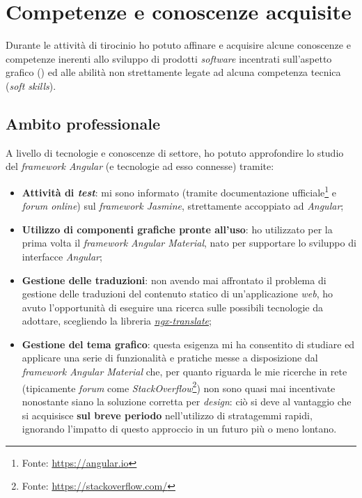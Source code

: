 \section{Competenze e conoscenze acquisite}
Durante le attività di tirocinio ho potuto affinare e acquisire alcune conoscenze e competenze inerenti allo sviluppo di prodotti \textit{software} incentrati sull'aspetto grafico () ed alle abilità non strettamente legate ad alcuna competenza tecnica (\textit{soft skills}).
\subsection*{Ambito professionale}
A livello di tecnologie e conoscenze di settore, ho potuto approfondire lo studio del \textit{framework Angular} (e tecnologie ad esso connesse) tramite:
\begin{itemize}
    \item \textbf{Attività di \textit{test}}: mi sono informato (tramite documentazione ufficiale\footnote{Fonte: \href{https://angular.io/guide/testing}{https://angular.io}} e \textit{forum online}) sul \textit{framework Jasmine}, strettamente accoppiato ad \textit{Angular};
    \item \textbf{Utilizzo di componenti grafiche pronte all'uso}: ho utilizzato per la prima volta il \textit{framework Angular Material}, nato per supportare lo sviluppo di interfacce \textit{Angular};
    \item \textbf{Gestione delle traduzioni}: non avendo mai affrontato il problema di gestione delle traduzioni del contenuto statico di un'applicazione \textit{web}, ho avuto l'opportunità di eseguire una ricerca sulle possibili tecnologie da adottare, scegliendo la libreria \hyperref[subsubsec:ngx]{\textit{ngx-translate}};
    \item \textbf{Gestione del tema grafico}: questa esigenza mi ha consentito di studiare ed applicare una serie di funzionalità e pratiche messe a disposizione dal \textit{framework Angular Material} che, per quanto riguarda le mie ricerche in rete (tipicamente \textit{forum} come \textit{StackOverflow}\footnote{Fonte: \href{https://stackoverflow.com/}{https://stackoverflow.com/}})
        non sono quasi mai incentivate nonostante siano la soluzione corretta per \textit{design}: ciò si deve al vantaggio che si acquisisce \textbf{sul breve periodo} nell'utilizzo di stratagemmi rapidi, ignorando l'impatto di questo approccio in un futuro più o meno lontano.
\end{itemize}

